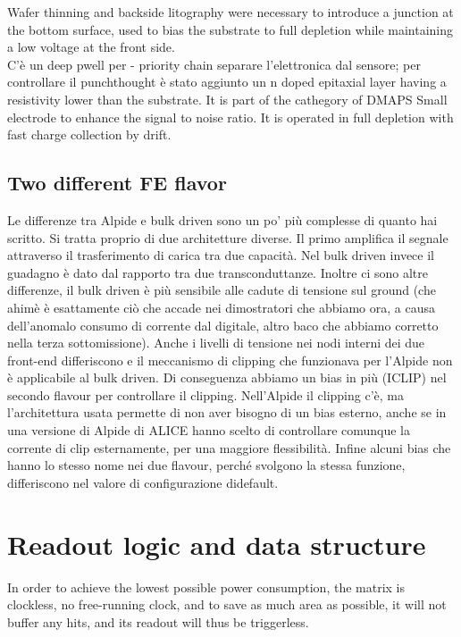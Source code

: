     Wafer thinning and backside litography were necessary to introduce a junction at the bottom surface, used to bias the substrate to full depletion while maintaining a low voltage at the front side.  \\
    C'è un deep pwell per - priority chain separare l'elettronica dal sensore; per controllare il punchthought
    è stato aggiunto un n doped epitaxial layer having a resistivity lower than the substrate.
    It is part of the cathegory of DMAPS
    Small electrode to enhance the signal to noise ratio.
    It is operated in full depletion with fast charge collection by drift.

    \subsection{Two different FE flavor}

        Le differenze tra Alpide e bulk driven sono un po' più complesse di quanto
        hai scritto.
        Si tratta proprio di due architetture diverse.
        Il primo amplifica il segnale attraverso il trasferimento di carica tra
        due capacità.
        Nel bulk driven invece il guadagno è dato dal rapporto tra due
        transconduttanze. Inoltre ci sono altre differenze, il bulk driven è più sensibile alle cadute di tensione sul ground (che ahimè è esattamente ciò che accade nei dimostratori che abbiamo ora, a causa dell'anomalo consumo di corrente dal digitale, altro baco che abbiamo corretto nella terza sottomissione).
        Anche i livelli di tensione nei nodi interni dei due front-end differiscono e il meccanismo di clipping che funzionava per l'Alpide non è applicabile al bulk driven. Di conseguenza abbiamo un bias in più (ICLIP) nel secondo flavour per controllare il clipping. Nell'Alpide il clipping c'è, ma l'architettura usata permette di non aver bisogno di un bias esterno, anche se in una versione di Alpide di ALICE hanno scelto di controllare comunque la corrente di clip esternamente, per una maggiore flessibilità. Infine alcuni bias che hanno lo stesso nome nei due flavour, perché svolgono la stessa funzione, differiscono nel valore di configurazione didefault.
        

        


\section{Readout logic and data structure}
    In order to achieve the lowest possible power consumption, the matrix is clockless, no free-running clock, and to save as much area as possible, it will not buffer any hits, and its readout will thus be triggerless.

